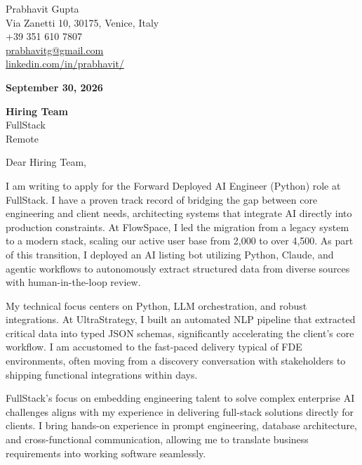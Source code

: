 \documentclass[11pt,a4paper]{article}
\begin{document}
\begin{flushright}
Prabhavit Gupta \\
Via Zanetti 10, 30175, Venice, Italy \\
+39 351 610 7807 \\
\href{mailto:prabhavitg@gmail.com}{prabhavitg@gmail.com} \\
\href{https://www.linkedin.com/in/prabhavit/}{linkedin.com/in/prabhavit/}
\end{flushright}

\vspace{2em}

\noindent \textbf{September 30, 2026}

\vspace{1em}

\noindent \textbf{Hiring Team} \\
FullStack \\
Remote

\vspace{1.5em}

\noindent Dear Hiring Team,

\vspace{1em}

\noindent I am writing to apply for the Forward Deployed AI Engineer (Python) role at FullStack. I have a proven track record of bridging the gap between core engineering and client needs, architecting systems that integrate AI directly into production constraints. At FlowSpace, I led the migration from a legacy system to a modern stack, scaling our active user base from 2,000 to over 4,500. As part of this transition, I deployed an AI listing bot utilizing Python, Claude, and agentic workflows to autonomously extract structured data from diverse sources with human-in-the-loop review.

\vspace{1em}

\noindent My technical focus centers on Python, LLM orchestration, and robust integrations. At UltraStrategy, I built an automated NLP pipeline that extracted critical data into typed JSON schemas, significantly accelerating the client’s core workflow. I am accustomed to the fast-paced delivery typical of FDE environments, often moving from a discovery conversation with stakeholders to shipping functional integrations within days. 

\vspace{1em}

\noindent FullStack’s focus on embedding engineering talent to solve complex enterprise AI challenges aligns with my experience in delivering full-stack solutions directly for clients. I bring hands-on experience in prompt engineering, database architecture, and cross-functional communication, allowing me to translate business requirements into working software seamlessly.
\end{document}
